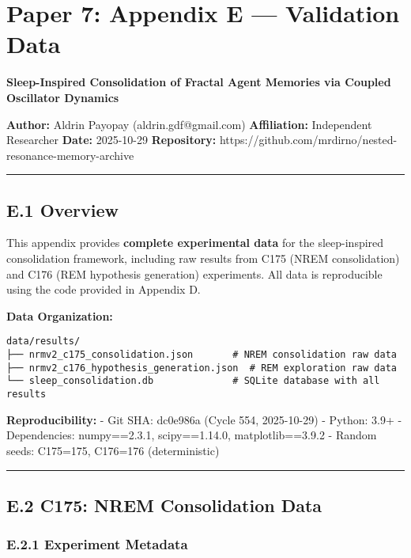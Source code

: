 \documentclass[
]{article}
\author{}
\date{}
\begin{document}
\section{Paper 7: Appendix E --- Validation
Data}\label{paper-7-appendix-e-validation-data}

\textbf{Sleep-Inspired Consolidation of Fractal Agent Memories via
Coupled Oscillator Dynamics}

\textbf{Author:} Aldrin Payopay (aldrin.gdf@gmail.com)
\textbf{Affiliation:} Independent Researcher \textbf{Date:} 2025-10-29
\textbf{Repository:}
https://github.com/mrdirno/nested-resonance-memory-archive

\begin{center}\rule{0.5\linewidth}{0.5pt}\end{center}

\subsection{E.1 Overview}\label{e.1-overview}

This appendix provides \textbf{complete experimental data} for the
sleep-inspired consolidation framework, including raw results from C175
(NREM consolidation) and C176 (REM hypothesis generation) experiments.
All data is reproducible using the code provided in Appendix D.

\textbf{Data Organization:}

\begin{verbatim}
data/results/
├── nrmv2_c175_consolidation.json       # NREM consolidation raw data
├── nrmv2_c176_hypothesis_generation.json  # REM exploration raw data
└── sleep_consolidation.db              # SQLite database with all results
\end{verbatim}

\textbf{Reproducibility:} - Git SHA: dc0e986a (Cycle 554, 2025-10-29) -
Python: 3.9+ - Dependencies: numpy==2.3.1, scipy==1.14.0,
matplotlib==3.9.2 - Random seeds: C175=175, C176=176 (deterministic)

\begin{center}\rule{0.5\linewidth}{0.5pt}\end{center}

\subsection{E.2 C175: NREM Consolidation
Data}\label{e.2-c175-nrem-consolidation-data}

\subsubsection{E.2.1 Experiment
Metadata}\label{e.2.1-experiment-metadata}
\end{document}
